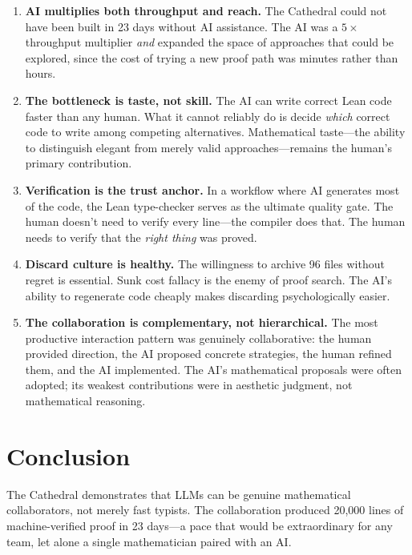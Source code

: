 \documentclass[11pt,a4paper]{article}
\begin{document}
\begin{enumerate}
  \item \textbf{AI multiplies both throughput and reach.} The
    Cathedral could not have been built in 23 days without AI
    assistance. The AI was a $5\times$ throughput multiplier
    \emph{and} expanded the space of approaches that could be
    explored, since the cost of trying a new proof path was
    minutes rather than hours.

  \item \textbf{The bottleneck is taste, not skill.} The AI can
    write correct Lean code faster than any human. What it cannot
    reliably do is decide \emph{which} correct code to write among
    competing alternatives. Mathematical taste---the ability to
    distinguish elegant from merely valid approaches---remains
    the human's primary contribution.

  \item \textbf{Verification is the trust anchor.} In a workflow
    where AI generates most of the code, the Lean type-checker
    serves as the ultimate quality gate. The human doesn't need to
    verify every line---the compiler does that. The human needs to
    verify that the \emph{right thing} was proved.

  \item \textbf{Discard culture is healthy.} The willingness to
    archive 96 files without regret is essential. Sunk cost fallacy
    is the enemy of proof search. The AI's ability to regenerate
    code cheaply makes discarding psychologically easier.

  \item \textbf{The collaboration is complementary, not hierarchical.}
    The most productive interaction pattern was genuinely
    collaborative: the human provided direction, the AI proposed
    concrete strategies, the human refined them, and the AI
    implemented. The AI's mathematical proposals were often adopted;
    its weakest contributions were in aesthetic judgment, not
    mathematical reasoning.
\end{enumerate}

\section{Conclusion}

The Cathedral demonstrates that LLMs can be genuine mathematical
collaborators, not merely fast typists. The collaboration produced
20,000 lines of machine-verified proof in 23 days---a pace that
would be extraordinary for any team, let alone a single
mathematician paired with an AI.
\end{document}
